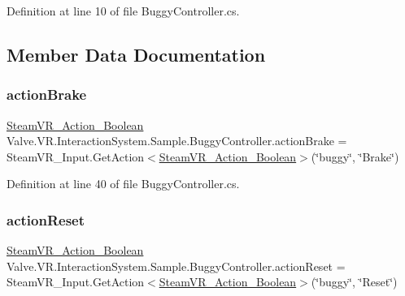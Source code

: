 Definition at line 10 of file Buggy\+Controller.\+cs.



\subsection{Member Data Documentation}
\mbox{\label{class_valve_1_1_v_r_1_1_interaction_system_1_1_sample_1_1_buggy_controller_a539e89906869180eb98c7e048f9886db}} 
\subsubsection{\texorpdfstring{actionBrake}{actionBrake}}
{\footnotesize\ttfamily \mbox{\hyperlink{class_valve_1_1_v_r_1_1_steam_v_r___action___boolean}{Steam\+V\+R\+\_\+\+Action\+\_\+\+Boolean}} Valve.\+V\+R.\+Interaction\+System.\+Sample.\+Buggy\+Controller.\+action\+Brake = Steam\+V\+R\+\_\+\+Input.\+Get\+Action$<$\mbox{\hyperlink{class_valve_1_1_v_r_1_1_steam_v_r___action___boolean}{Steam\+V\+R\+\_\+\+Action\+\_\+\+Boolean}}$>$(\char`\"{}buggy\char`\"{}, \char`\"{}Brake\char`\"{})}



Definition at line 40 of file Buggy\+Controller.\+cs.

\mbox{\label{class_valve_1_1_v_r_1_1_interaction_system_1_1_sample_1_1_buggy_controller_ac62dfc63df769ac36dca75d2b1b032c8}} 
\subsubsection{\texorpdfstring{actionReset}{actionReset}}
{\footnotesize\ttfamily \mbox{\hyperlink{class_valve_1_1_v_r_1_1_steam_v_r___action___boolean}{Steam\+V\+R\+\_\+\+Action\+\_\+\+Boolean}} Valve.\+V\+R.\+Interaction\+System.\+Sample.\+Buggy\+Controller.\+action\+Reset = Steam\+V\+R\+\_\+\+Input.\+Get\+Action$<$\mbox{\hyperlink{class_valve_1_1_v_r_1_1_steam_v_r___action___boolean}{Steam\+V\+R\+\_\+\+Action\+\_\+\+Boolean}}$>$(\char`\"{}buggy\char`\"{}, \char`\"{}Reset\char`\"{})}



